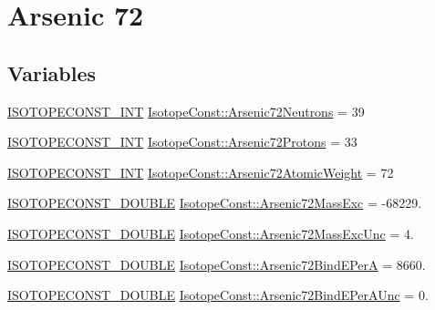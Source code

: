 \hypertarget{group___isotope_const-_arsenic-_as72}{}\section{Arsenic 72}
\label{group___isotope_const-_arsenic-_as72}
\subsection*{Variables}
\begin{DoxyCompactItemize}
\item 
\mbox{\hyperlink{group___isotope_const-_macros_ga5f18360b3e99483a35c32d789e62621c}{I\+S\+O\+T\+O\+P\+E\+C\+O\+N\+S\+T\+\_\+\+I\+NT}} \mbox{\hyperlink{group___isotope_const-_arsenic-_as72_ga7953289ca634b3c85b81b19f1b03f3f2}{Isotope\+Const\+::\+Arsenic72\+Neutrons}} = 39
\item 
\mbox{\hyperlink{group___isotope_const-_macros_ga5f18360b3e99483a35c32d789e62621c}{I\+S\+O\+T\+O\+P\+E\+C\+O\+N\+S\+T\+\_\+\+I\+NT}} \mbox{\hyperlink{group___isotope_const-_arsenic-_as72_ga21370b5279c95e8feea06a28816f31e8}{Isotope\+Const\+::\+Arsenic72\+Protons}} = 33
\item 
\mbox{\hyperlink{group___isotope_const-_macros_ga5f18360b3e99483a35c32d789e62621c}{I\+S\+O\+T\+O\+P\+E\+C\+O\+N\+S\+T\+\_\+\+I\+NT}} \mbox{\hyperlink{group___isotope_const-_arsenic-_as72_gac02fcf0f9451467f1d8d24dc8b43c2a9}{Isotope\+Const\+::\+Arsenic72\+Atomic\+Weight}} = 72
\item 
\mbox{\hyperlink{group___isotope_const-_macros_ga8f45a7272ce02c0b4c65c44636ed719a}{I\+S\+O\+T\+O\+P\+E\+C\+O\+N\+S\+T\+\_\+\+D\+O\+U\+B\+LE}} \mbox{\hyperlink{group___isotope_const-_arsenic-_as72_ga294e9563ed2d0ae80c1abad69c7c8c4e}{Isotope\+Const\+::\+Arsenic72\+Mass\+Exc}} = -\/68229.
\item 
\mbox{\hyperlink{group___isotope_const-_macros_ga8f45a7272ce02c0b4c65c44636ed719a}{I\+S\+O\+T\+O\+P\+E\+C\+O\+N\+S\+T\+\_\+\+D\+O\+U\+B\+LE}} \mbox{\hyperlink{group___isotope_const-_arsenic-_as72_ga452b0345d7c7b923c887df82acc57ba2}{Isotope\+Const\+::\+Arsenic72\+Mass\+Exc\+Unc}} = 4.
\item 
\mbox{\hyperlink{group___isotope_const-_macros_ga8f45a7272ce02c0b4c65c44636ed719a}{I\+S\+O\+T\+O\+P\+E\+C\+O\+N\+S\+T\+\_\+\+D\+O\+U\+B\+LE}} \mbox{\hyperlink{group___isotope_const-_arsenic-_as72_ga0e5c103658e5db168b47cb0705ba1d75}{Isotope\+Const\+::\+Arsenic72\+Bind\+E\+PerA}} = 8660.
\item 
\mbox{\hyperlink{group___isotope_const-_macros_ga8f45a7272ce02c0b4c65c44636ed719a}{I\+S\+O\+T\+O\+P\+E\+C\+O\+N\+S\+T\+\_\+\+D\+O\+U\+B\+LE}} \mbox{\hyperlink{group___isotope_const-_arsenic-_as72_ga8590584ad6dfa0a9163c935b7c14ebe1}{Isotope\+Const\+::\+Arsenic72\+Bind\+E\+Per\+A\+Unc}} = 0.

\end{DoxyCompactItemize}
